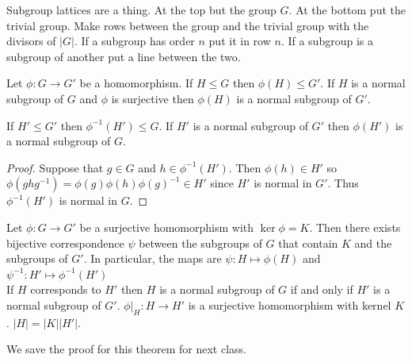 \documentclass{article}
\newcommand{\ra}[1][]{\xrightarrow{#1}}
\begin{document}
Subgroup lattices are a thing. At the top but the group $G$. At the bottom put the trivial group. Make rows between the group and the trivial group with the divisors of $|G|$. If a subgroup has order $n$ put it in row $n$. If a subgroup is a subgroup of another put a line between the two.
\begin{proposition}
Let $\phi:G\ra{}G'$ be a homomorphism. If $H\leq G$ then $\phi(H)\leq G'$. If $H$ is a normal subgroup of $G$ and $\phi$ is surjective then $\phi(H)$ is a normal subgroup of $G'$.
\end{proposition}
\begin{proposition}
If $H'\leq G'$ then $\phi^{-1}(H')\leq G$. If $H'$ is a normal subgroup of $G'$ then $\phi(H')$ is a normal subgroup of $G$. 
\end{proposition}
\begin{proof}
Suppose that $g\in G$ and $h\in \phi^{-1}(H')$. Then $\phi(h)\in H'$ so $\phi(ghg^{-1})=\phi(g)\phi(h)\phi(g)^{-1}\in H'$ since $H'$ is normal in $G'$. Thus $\phi^{-1}(H')$ is normal in $G$.
\end{proof}
\begin{theorem}
Let $\phi:G\ra G'$ be a surjective homomorphism with $\ker\phi=K$. Then there exists bijective correspondence $\psi$ between the subgroups of $G$ that contain $K$ and the subgroups of $G'$. In particular, the maps are $\psi:H\mapsto \phi(H)$ and $\psi^{-1}:H'\mapsto\phi^{-1}(H')$
\\
If $H$ corresponds to $H'$ then $H$ is a normal subgroup of $G$ if and only if $H'$ is a normal subgroup of $G'$. $\phi|_H:H\ra H'$ is a surjective homomorphism with kernel $K$. $|H|=|K||H'|$.
\end{theorem}
We save the proof for this theorem for next class.
\end{document}
